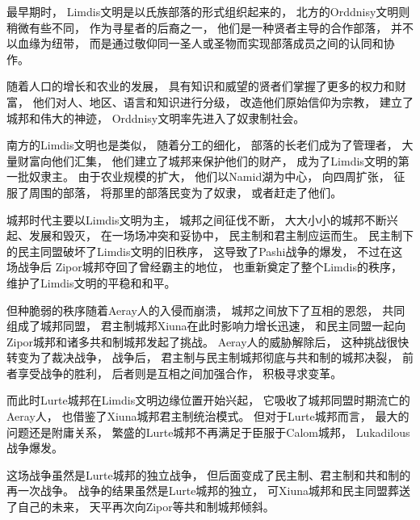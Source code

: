 \documentclass[UTF8,12pt,draft]{ctexbook}
\begin{document}
            最早期时，
            Limdis文明是以氏族部落的形式组织起来的，
            北方的Orddnisy文明则稍微有些不同，
            作为寻星者的后裔之一，
            他们是一种贤者主导的合作部落，
            并不以血缘为纽带，
            而是通过敬仰同一圣人或圣物而实现部落成员之间的认同和协作。

            随着人口的增长和农业的发展，
            具有知识和威望的贤者们掌握了更多的权力和财富，
            他们对人、地区、语言和知识进行分级，
            改造他们原始信仰为宗教，
            建立了城邦和伟大的神迹，
            Orddnisy文明率先进入了奴隶制社会。
            
            南方的Limdis文明也是类似，
            随着分工的细化，
            部落的长老们成为了管理者，
            大量财富向他们汇集，
            他们建立了城邦来保护他们的财产，
            成为了Limdis文明的第一批奴隶主。
            由于农业规模的扩大，
            他们以Namid湖为中心，
            向四周扩张，
            征服了周围的部落，
            将那里的部落民变为了奴隶，
            或者赶走了他们。

            城邦时代主要以Limdis文明为主，
            城邦之间征伐不断，
            大大小小的城邦不断兴起、发展和毁灭，
            在一场场冲突和妥协中，
            民主制和君主制应运而生。
            民主制下的民主同盟破坏了Limdis文明的旧秩序，
            这导致了Pashi战争的爆发，
            不过在这场战争后
            Zipor城邦夺回了曾经霸主的地位，
            也重新奠定了整个Limdis的秩序，
            维护了Limdis文明的平稳和和平。

            
            但种脆弱的秩序随着Aeray人的入侵而崩溃，
            城邦之间放下了互相的恩怨，
            共同组成了城邦同盟，
            君主制城邦Xiuna在此时影响力增长迅速，
            和民主同盟一起向Zipor城邦和诸多共和制城邦发起了挑战。
            Aeray人的威胁解除后，
            这种挑战很快转变为了裁决战争，
            战争后，
            君主制与民主制城邦彻底与共和制的城邦决裂，
            前者享受战争的胜利，
            后者则是互相之间加强合作，
            积极寻求变革。

            而此时Lurte城邦在Limdis文明边缘位置开始兴起，
            它吸收了城邦同盟时期流亡的Aeray人，
            也借鉴了Xiuna城邦君主制统治模式。
            但对于Lurte城邦而言，
            最大的问题还是附庸关系，
            繁盛的Lurte城邦不再满足于臣服于Calom城邦，
            Lukadilous战争爆发。

            这场战争虽然是Lurte城邦的独立战争，
            但后面变成了民主制、君主制和共和制的再一次战争。
            战争的结果虽然是Lurte城邦的独立，
            可Xiuna城邦和民主同盟葬送了自己的未来，
            天平再次向Zipor等共和制城邦倾斜。
\end{document}
